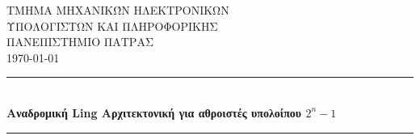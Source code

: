 
\begin{titlepage} %
	\newcommand{\HRule}{\rule{\linewidth}{0.5mm}} %
	
	\center %
	
	
	\textsc{\LARGE ΤΜΗΜΑ ΜΗΧΑΝΙΚΏΝ ΗΛΕΚΤΡΟΝΙΚΩΝ \\[0.2cm] ΥΠΟΛΟΓΙΣΤΩΝ ΚΑΙ ΠΛΗΡΟΦΟΡΙΚΗΣ}\\[1.5cm]
	\textsc{\Large ΠΑΝΕΠΙΣΤΗΜΙΟ ΠΑΤΡΑΣ}\\[0.8cm] 
	\textsc{\large \today}\\[1cm]
	
	
	\HRule\\[0.4cm]
	{\huge\bfseries Αναδρομική Ling Αρχιτεκτονική για αθροιστές υπολοίπου $2^n-1$}\\[0.4cm] 
	\HRule\\[3cm]
	


\end{titlepage}
